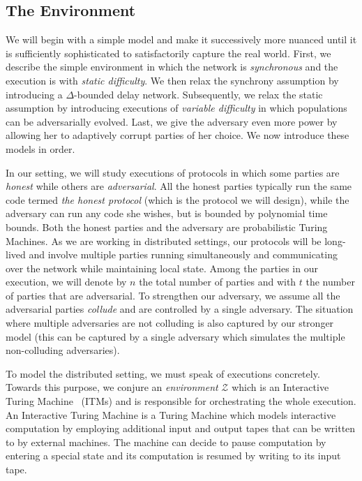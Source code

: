 \subsection{The Environment}\label{sec:env}

We will begin with a simple model and make it successively more nuanced until it
is sufficiently sophisticated to satisfactorily capture the real world. First,
we describe the simple environment in which the network is \emph{synchronous}
and the execution is with \emph{static difficulty}. We then relax the synchrony
assumption by introducing a $\Delta$-bounded delay network. Subsequently, we
relax the static assumption by introducing executions of
\emph{variable difficulty} in which populations can be adversarially evolved.
Last, we give the adversary even more power by allowing her to adaptively
corrupt parties of her choice. We now introduce these models in order.

In our setting, we will study executions of protocols in which some parties
are \emph{honest} while others are \emph{adversarial}. All the honest parties
typically run the same code termed \emph{the honest protocol} (which is the
protocol we will design), while the adversary can run any code she wishes, but
is bounded by polynomial time bounds. Both the honest parties and the adversary
are probabilistic Turing Machines. As we are working in distributed settings,
our protocols will be long-lived and involve multiple parties running
simultaneously and communicating over the network while maintaining local state.
Among the parties in our execution, we will denote by $n$ the total number of
parties and with $t$ the number of parties that are adversarial. To strengthen
our adversary, we assume all the adversarial parties \emph{collude} and are
controlled by a single adversary. The situation where multiple adversaries are
not colluding is also captured by our stronger model (this can be captured by a
single adversary which simulates the multiple non-colluding adversaries).

To model the distributed setting, we must speak of executions concretely.
Towards this purpose, we conjure an \emph{environment} $\mathcal{Z}$
 which is an
Interactive Turing Machine~\cite{interactive-tm} (ITMs)  and is responsible for
orchestrating the whole execution. An Interactive Turing Machine is a Turing
Machine which models interactive computation by employing additional input and
output tapes that can be written to by external machines. The machine can decide
to pause computation by entering a special state and its computation is resumed
by writing to its input tape.

